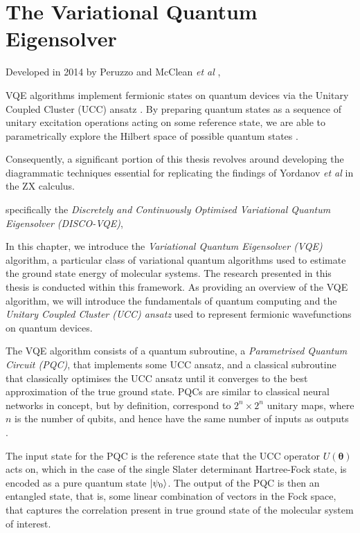 \section{The Variational Quantum Eigensolver}%
\label{vqe}

Developed in 2014 by Peruzzo and McClean \textit{et al} \cite{Peruzzo2014}, 

 VQE algorithms implement fermionic states on quantum devices via the Unitary Coupled Cluster (UCC) ansatz \cite{Taube2006}. By preparing quantum states as a sequence of unitary excitation operations acting on some reference state, we are able to parametrically explore the Hilbert space of possible quantum states \cite{McClean2016}.

Consequently, a significant portion of this thesis revolves around developing the diagrammatic techniques essential for replicating the findings of Yordanov \textit{et al} in the ZX calculus.

specifically the \textit{Discretely and Continuously Optimised Variational Quantum Eigensolver (DISCO-VQE)},


In this chapter, we introduce the \textit{Variational Quantum Eigensolver (VQE)} algorithm, a particular class of variational quantum algorithms used to estimate the ground state energy of molecular systems. The research presented in this thesis is conducted within this framework. As providing an overview of the VQE algorithm, we will introduce the fundamentals of quantum computing and the \textit{Unitary Coupled Cluster (UCC) ansatz} used to represent fermionic wavefunctions on quantum devices.

The VQE algorithm consists of a quantum subroutine, a \textit{Parametrised Quantum Circuit (PQC)}, that implements some UCC ansatz, and a classical subroutine that classically optimises the UCC ansatz until it converges to the best approximation of the true ground state. PQCs are similar to classical neural networks in concept, but by definition, correspond to $2^n \times 2^n$ unitary maps, where $n$ is the number of qubits, and hence have the same number of inputs as outputs \cite{Yeung2020}.

The input state for the PQC is the reference state that the UCC operator $U(\bm\theta)$ acts on, which in the case of the single Slater determinant Hartree-Fock state, is encoded as a pure quantum state $\ket{\psi_0}$. The output of the PQC is then an entangled state, that is, some linear combination of vectors in the Fock space, that captures the correlation present in true ground state of the molecular system of interest.

